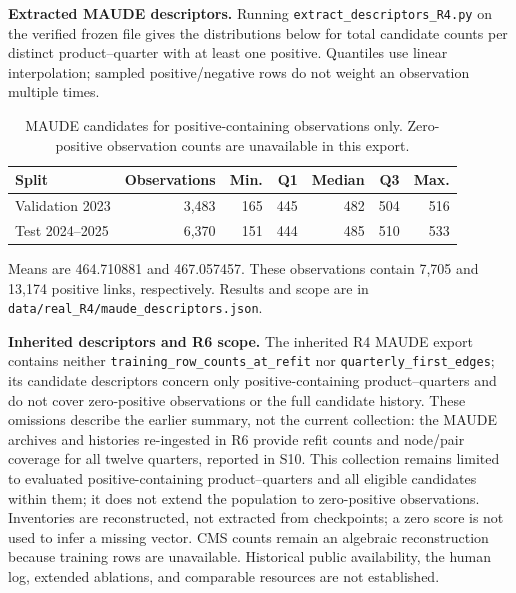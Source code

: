 \documentclass[10pt,a4paper]{article}
\newcommand{\src}[1]{{\small\nolinkurl{#1}}}
\begin{document}
\par{}
\textbf{Extracted MAUDE descriptors.} Running \src{extract_descriptors_R4.py} on the verified frozen file gives the distributions below for total candidate counts per distinct product--quarter with at least one positive. Quantiles use linear interpolation; sampled positive/negative rows do not weight an observation multiple times.

\begin{table}[!htbp]\centering\small
\caption{MAUDE candidates for positive-containing observations only. Zero-positive observation counts are unavailable in this export.}
\begin{tabular}{@{}lrrrrrr@{}}\toprule
Split & Observations & Min. & Q1 & Median & Q3 & Max.\\\midrule
Validation 2023 & 3,483 & 165 & 445 & 482 & 504 & 516\\
Test 2024--2025 & 6,370 & 151 & 444 & 485 & 510 & 533\\\bottomrule
\end{tabular}
\end{table}

Means are 464.710881 and 467.057457. These observations contain 7,705 and 13,174 positive links, respectively. Results and scope are in \src{data/real_R4/maude_descriptors.json}.

\textbf{Inherited descriptors and R6 scope.} The inherited R4 MAUDE export contains neither \src{training_row_counts_at_refit} nor \src{quarterly_first_edges}; its candidate descriptors concern only positive-containing product--quarters and do not cover zero-positive observations or the full candidate history. These omissions describe the earlier summary, not the current collection: the MAUDE archives and histories re-ingested in R6 provide refit counts and node/pair coverage for all twelve quarters, reported in S10. This collection remains limited to evaluated positive-containing product--quarters and all eligible candidates within them; it does not extend the population to zero-positive observations. Inventories are reconstructed, not extracted from checkpoints; a zero score is not used to infer a missing vector. CMS counts remain an algebraic reconstruction because training rows are unavailable. Historical public availability, the human log, extended ablations, and comparable resources are not established.
\end{document}
